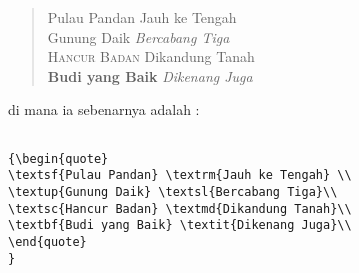 {\begin{quote}
\textsf{Pulau Pandan} \textrm{Jauh ke Tengah} \\
\textup{Gunung Daik} \textsl{Bercabang Tiga}\\
\textsc{Hancur Badan} \textmd{Dikandung Tanah}\\
\textbf{Budi yang Baik} \textit{Dikenang Juga}\\
\end{quote}
}

di mana ia sebenarnya adalah :\\

\begin{Verbatim}[frame=single]

{\begin{quote}
\textsf{Pulau Pandan} \textrm{Jauh ke Tengah} \\
\textup{Gunung Daik} \textsl{Bercabang Tiga}\\
\textsc{Hancur Badan} \textmd{Dikandung Tanah}\\
\textbf{Budi yang Baik} \textit{Dikenang Juga}\\
\end{quote}
}
\end{Verbatim}